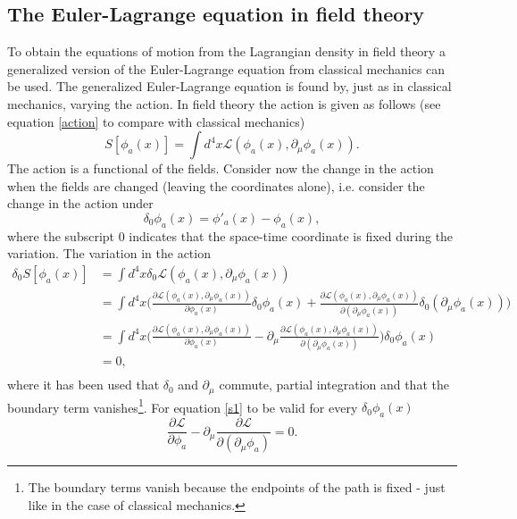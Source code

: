 \subsection{The Euler-Lagrange equation in field theory}
To obtain the equations of motion from the Lagrangian density in field theory a generalized version of the Euler-Lagrange equation from classical mechanics can be used. The generalized Euler-Lagrange equation is found by, just as in classical mechanics, varying the action. In field theory the action is given as follows (see equation \eqref{action} to compare with classical mechanics) 
\begin{equation}
	S[\phi_a(x)]=\int d^4x\mathcal{L}(\phi_a(x),\partial_\mu\phi_a(x)).
\end{equation} 
The action is a functional of the fields. Consider now the change in the action when the fields are changed (leaving the coordinates alone), i.e. consider the change in the action under
\begin{equation}
	\delta_0 \phi_a(x)=\phi'_a(x)-\phi_a(x),
\end{equation} 
where the subscript $0$ indicates that the space-time coordinate is fixed during the variation. The variation in the action
\begin{equation}
	\begin{split}
		\delta_0 S[\phi_a(x)]&=\int d^4x\delta_0\mathcal{L}(\phi_a(x),\partial_\mu\phi_a(x))\\
		&=\int d^4x\bigg(\frac{\partial \mathcal{L}(\phi_a(x),\partial_\mu\phi_a(x))}{\partial \phi_a(x)}\delta_0 \phi_a(x)+\frac{\partial \mathcal{L}(\phi_a(x),\partial_\mu\phi_a(x))}{\partial (\partial_\mu\phi_a(x))}\delta_0 (\partial_\mu\phi_a(x))\bigg)\\
		&=\int d^4x\bigg(\frac{\partial \mathcal{L}(\phi_a(x),\partial_\mu\phi_a(x))}{\partial \phi_a(x)}-\partial_\mu \frac{\partial \mathcal{L}(\phi_a(x),\partial_\mu\phi_a(x))}{\partial (\partial_\mu\phi_a(x))}\bigg)\delta_0 \phi_a(x)\\
		&=0,\\
	\end{split}
	\label{s1}
\end{equation} 
where it has been used that $\delta_0$ and $\partial_\mu$ commute, partial integration and that the boundary term vanishes\footnote{The boundary terms vanish because the endpoints of the path is fixed - just like in the case of classical mechanics.}. For equation \eqref{s1} to be valid for every $\delta_0 \phi_a(x)$
\begin{equation}
	\frac{\partial \mathcal{L}}{\partial \phi_a}-\partial_\mu\frac{\partial \mathcal{L}}{\partial (\partial_\mu\phi_a)}=0.
	\label{EL1}
\end{equation} 
